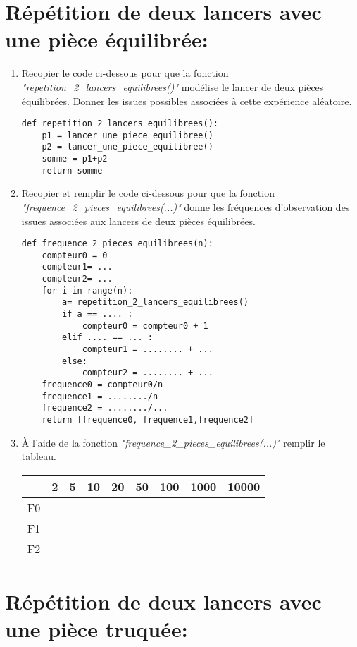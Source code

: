 \documentclass[11pt,a4paper]{book}
\begin{document}
\section{Répétition de deux lancers avec une pièce équilibrée:}

\begin{enumerate}
	\item Recopier le code ci-dessous pour que la fonction \emph{"repetition\_2\_lancers\_equilibrees()"} modélise le lancer de deux pièces équilibrées. Donner les issues possibles associées à cette expérience aléatoire. 
\begin{lstlisting}[style=stylepython]
def repetition_2_lancers_equilibrees():
	p1 = lancer_une_piece_equilibree()
	p2 = lancer_une_piece_equilibree()
	somme = p1+p2
	return somme			
\end{lstlisting}
\item Recopier et remplir le code ci-dessous pour que la fonction \emph{"frequence\_2\_pieces\_equilibrees(...)"} donne les fréquences d'observation des issues associées aux lancers de deux pièces équilibrées.
\begin{lstlisting}[style=stylepython]
def frequence_2_pieces_equilibrees(n): 
	compteur0 = 0
	compteur1= ...
	compteur2= ...
	for i in range(n):
		a= repetition_2_lancers_equilibrees()
		if a == .... :
			compteur0 = compteur0 + 1
		elif .... == ... :
			compteur1 = ........ + ...
		else:
			compteur2 = ........ + ...
	frequence0 = compteur0/n
	frequence1 = ......../n
	frequence2 = ......../...
	return [frequence0, frequence1,frequence2]			
\end{lstlisting}
\item À l'aide de la fonction \emph{"frequence\_2\_pieces\_equilibrees(...)"} remplir le tableau.
\begin{table}[htbp]
	\centering
	\begin{tabularx}{\textwidth}{| X | X | X | X | X | X | X | X | X |}
		\hline
		& 
		2 & 5 & 10 & 20 & 50 & 100 &1000&10000  \\ 
		\hline
		F0   &  &  &  &  & & & & \\[0.2cm]  \hline
		F1   &  &  &  &  & & & & \\[0.2cm] \hline
		F2 &   & & & & & & & \\[0.2cm] \hline
	\end{tabularx}
\end{table}
\end{enumerate}	

\newpage

\section{Répétition de deux lancers avec une pièce truquée:}
\end{document}
